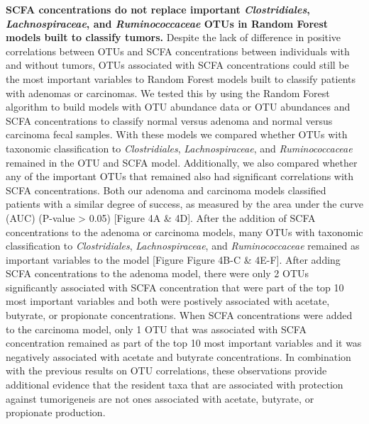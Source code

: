 \documentclass[11pt,]{article}
\begin{document}
\textbf{SCFA concentrations do not replace important
\emph{Clostridiales}, \emph{Lachnospiraceae}, and \emph{Ruminococcaceae}
OTUs in Random Forest models built to classify tumors.} Despite the lack
of difference in positive correlations between OTUs and SCFA
concentrations between individuals with and without tumors, OTUs
associated with SCFA concentrations could still be the most important
variables to Random Forest models built to classify patients with
adenomas or carcinomas. We tested this by using the Random Forest
algorithm to build models with OTU abundance data or OTU abundances and
SCFA concentrations to classify normal versus adenoma and normal versus
carcinoma fecal samples. With these models we compared whether OTUs with
taxonomic classification to \emph{Clostridiales},
\emph{Lachnospiraceae}, and \emph{Ruminococcaceae} remained in the OTU
and SCFA model. Additionally, we also compared whether any of the
important OTUs that remained also had significant correlations with SCFA
concentrations. Both our adenoma and carcinoma models classified
patients with a similar degree of success, as measured by the area under
the curve (AUC) (P-value \textgreater{} 0.05) {[}Figure 4A \& 4D{]}.
After the addition of SCFA concentrations to the adenoma or carcinoma
models, many OTUs with taxonomic classification to \emph{Clostridiales},
\emph{Lachnospiraceae}, and \emph{Ruminococcaceae} remained as important
variables to the model {[}Figure Figure 4B-C \& 4E-F{]}. After adding
SCFA concentrations to the adenoma model, there were only 2 OTUs
significantly associated with SCFA concentration that were part of the
top 10 most important variables and both were postively associated with
acetate, butyrate, or propionate concentrations. When SCFA
concentrations were added to the carcinoma model, only 1 OTU that was
associated with SCFA concentration remained as part of the top 10 most
important variables and it was negatively associated with acetate and
butyrate concentrations. In combination with the previous results on OTU
correlations, these observations provide additional evidence that the
resident taxa that are associated with protection against tumorigeneis
are not ones associated with acetate, butyrate, or propionate
production.
\end{document}
